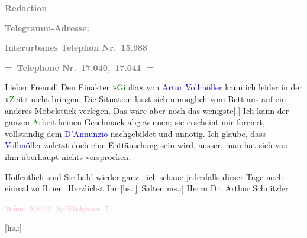 \pstart
           \textcolor{gray}{\textbf{\textbf{Redaction}}}\pend
           
\pstart
           \textcolor{gray}{\textbf{Telegramm-Adresse: \textcolor{brown}{}{}\ledrightnote{\textcolor{brown}{Die Zeit}}\so{,}{ }\textcolor{pink}{}{}\ledrightnote{\textcolor{pink}{Wien}}}}\pend
           
\pstart
           \textcolor{gray}{\textbf{Interurbanes Telephon Nr. 15.988}}\pend
           
\pstart
           \textcolor{gray}{\textbf{= Telephone Nr. 17.040, 17.041 =}}\pend
           
\pstart\center{}Lieber Freund!\pend
\pstart
           Den Einakter »\textcolor{green}{Giulia}{}\ledrightnote{\textcolor{green}{Giulia. Drama in einem Akt}}« von \textcolor{blue}{Artur Vollmöller}{}\ledrightnote{\textcolor{blue}{Karl Gustav Vollmoeller}} kann ich leider in der »\textcolor{green}{Zeit}{}\ledrightnote{\textcolor{green}{Die Zeit}}« nicht bringen. Die Situation lässt sich unmöglich vom
               Bett aus auf ein anderes Möbelstück verlegen. Das wäre aber noch das
                  wenigste{[}.{]} Ich kann der ganzen \textcolor{green}{Arbeit}{}\ledrightnote{{$\rightarrow$}\textcolor{green}{Giulia. Drama in einem Akt}} keinen Geschmack abgewinnen; sie
               erscheint mir forciert, vollständig dem \textcolor{blue}{D’Annunzio}{}\ledrightnote{\textcolor{blue}{Gabriele D’Annunzio}} nachgebildet und unnötig. Ich glaube, dass \textcolor{blue}{Vollmöller}{}\ledrightnote{\textcolor{blue}{Karl Gustav Vollmoeller}} zuletzt doch eine Enttäuschung sein wird, ausser,
               man hat sich von ihm überhaupt nichts versprochen.\pend
           
\pstart
           Hoffentlich sind Sie bald wieder ganz \label{K_L03398-1v}\label{K_L03398-1h}, ich
               schaue jedenfalls dieser Tage noch einmal zu Ihnen.\pend
           \pstart Herzlichst Ihr \spacefill\mbox{{[}hs.:{]} Salten}\pend{}
\pstart
           \noindent{}{[}ms.:{]} Herrn Dr. Arthur Schnitzler\pend
           
\pstart
           \textcolor{pink}{Wien, XVIII. Spöttelgasse 7}{}\ledrightnote{\textcolor{pink}{Edmund-Weiß-Gasse 7}}\pend
           
\pstart
           {[}hs.:{]} \label{K_L03398-2v}\label{K_L03398-2h}\pend
           \endnumbering{}  
      
